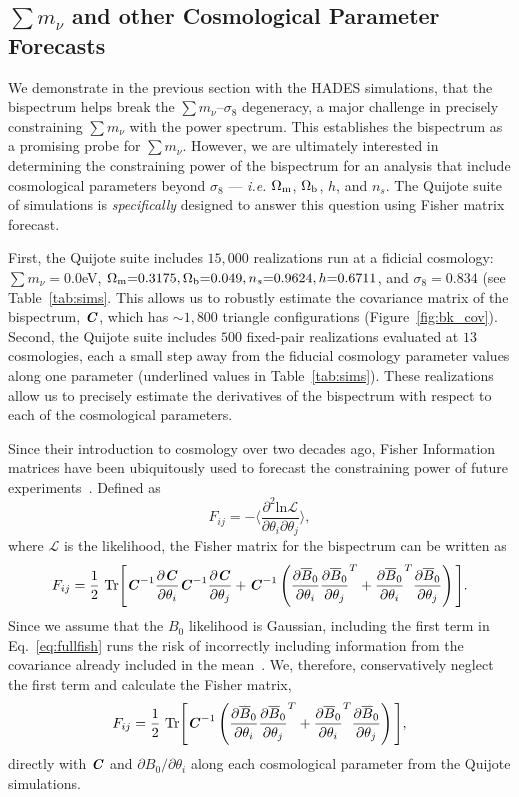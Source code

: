 \documentclass[12pt, letterpaper, preprint]{aastex62}
\newcommand{\Om}{\Omega_{\rm m}}
\newcommand{\Ob}{\Omega_{\rm b}}
\newcommand{\smnu}{\sum m_\nu}
\newcommand{\sig}{\sigma_8}
\newcommand{\bfi}[1]{\textbf{\textit{#1}}}
\newcommand{\parti}[1]{\frac{\partial #1}{\partial \theta_i}}
\newcommand{\partj}[1]{\frac{\partial #1}{\partial \theta_j}}
\newcommand{\beq}{\begin{equation}}
\newcommand{\eeq}{\end{equation}}
\begin{document}
\subsection{$\smnu$ and other Cosmological Parameter Forecasts} \label{sec:forecasts}
We demonstrate in the previous section with the HADES simulations, that 
the bispectrum helps break the $\smnu$--$\sig$ degeneracy, a major 
challenge in precisely constraining $\smnu$ with the power spectrum. 
This establishes the bispectrum as a promising probe for $\smnu$. However, 
we are ultimately interested in determining the constraining power of the 
bispectrum for an analysis that include cosmological parameters beyond 
$\sig$ --- \emph{i.e.} $\Om$, $\Ob$, $h$, and $n_s$. The Quijote 
suite of simulations is \emph{specifically} designed to answer this question
using Fisher matrix forecast. 

First, the Quijote suite includes $15,000$ realizations run at a fidicial 
cosmology: $\smnu{=}0.0$eV, $\Om{=}0.3175, \Ob{=}0.049, n_s{=}0.9624, h{=}0.6711$, 
and $\sig=0.834$ (see Table~\ref{tab:sims}. This allows us to robustly estimate 
the covariance matrix of the bispectrum, $\bfi{C}$, which has ${\sim}1,800$ 
triangle configurations (Figure~\ref{fig:bk_cov}). Second, the Quijote suite 
includes $500$ fixed-pair realizations evaluated at $13$ cosmologies, each a 
small step away from the fiducial cosmology parameter values along one 
parameter (underlined values in Table~\ref{tab:sims}). These realizations allow us 
to precisely estimate the derivatives of the bispectrum with respect to each 
of the cosmological parameters. 

Since their introduction to cosmology over two decades ago, Fisher Information 
matrices have been ubiquitously used to forecast the constraining power of future 
experiments~\citep[\emph{e.g.}][]{jungman1996,tegmark1997a,dodelson2003,heavens2009,verde2010}. 
Defined as 
\beq 
F_{ij} = - \bigg \langle \frac{\partial^2 \mathrm{ln} \mathcal{L}}{\partial \theta_i \partial \theta_j} \bigg \rangle,
\eeq
where $\mathcal{L}$ is the likelihood, the Fisher matrix for the bispectrum can 
be written as 
\beq \label{eq:fullfish} 
F_{ij} = \frac{1}{2}~\mathrm{Tr} \Bigg[\bfi{C}^{-1}\parti{\bfi{C}}\bfi{C}^{-1}\partj{\bfi{C}} + \bfi{C}^{-1} \left(\parti{\overline{B}_0}\partj{\overline{B}_0}^T + \parti{\overline{B}_0}^T \partj{\overline{B}_0} \right)\Bigg].
\eeq
Since we assume that the $B_0$ likelihood is Gaussian, including the first 
term in Eq.~\ref{eq:fullfish} runs the risk of incorrectly including information 
from the covariance already included in the mean~\citep{carron2013}. We, therefore,
conservatively neglect the first term and calculate the Fisher matrix, 
\beq \label{eq:fisher}
F_{ij} = \frac{1}{2}~\mathrm{Tr} \Bigg[\bfi{C}^{-1} \left(\parti{\overline{B}_0}\partj{\overline{B}_0}^T + \parti{\overline{B}_0}^T \partj{\overline{B}_0} \right)\Bigg],
\eeq
directly with $\bfi{C}$ and $\partial B_0/\partial \theta_i$ along each cosmological 
parameter from the Quijote simulations. 
\end{document}
